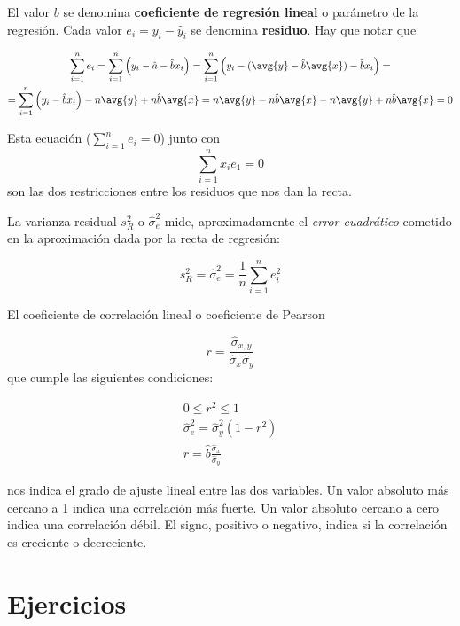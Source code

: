 \documentclass{apuntes}
\begin{document}
El valor $b$ se denomina \textbf{coeficiente de regresión lineal} o parámetro de la regresión. Cada valor $e_i= y_i - \hat{y}_i$ se denomina \textbf{residuo}. Hay que notar que

\begin{gather*}
 \sum_{i=1}^n e_i = \sum_{i=1}^n \left(y_i - \hat{a} -\hat{b}x_i \right)= \sum_{i=1}^n\left( y_i - (\avg{y} - \hat{b}\avg{x}) - \hat{b}x_i \right) = \\
 = \sum_{i=1}^n  \left(y_i - \hat{b}x_i\right) - n\avg{y}  + n\hat{b}\avg{x} = n\avg{y} - n \hat{b}\avg{x}- n\avg{y} + n\hat{b}\avg{x} = 0 \end{gather*}

Esta ecuación ($\sum_{i=1}^n e_i = 0$) junto con \[ \sum_{i=1}^n x_i e_1 = 0 \] son las dos restricciones entre los residuos que nos dan la recta.

\begin{defn}
La varianza residual $s_R^2$ o $\hat{\sigma}_e^2$ mide, aproximadamente el \textit{error cuadrático} cometido en la aproximación dada por la recta de regresión:

\[ s_R^2 = \hat{\sigma}_e^2 = \frac{1}{n}\sum_{i=1}^n e_i^2 \]
\end{defn}

\begin{defn}
El coeficiente de correlación lineal o coeficiente de Pearson

\[ r = \frac{\hat{\sigma}_{x,y}}{\hat{\sigma}_x \hat{\sigma}_y} \] que cumple las siguientes condiciones:

\begin{gather*}
0 ≤ r^2 ≤ 1 \\
\hat{\sigma}_e^2 = \hat{\sigma}_y^2(1-r^2) \\
r = \hat{b}\frac{\hat{\sigma}_x}{\hat{\sigma}_y} 
\end{gather*}

nos indica el grado de ajuste lineal entre las dos variables. Un valor absoluto más cercano a 1 indica una correlación más fuerte. Un valor absoluto cercano a cero indica una correlación débil. El signo, positivo o negativo, indica si la correlación es creciente o decreciente.
\end{defn}

\appendix
\section{Ejercicios}
\end{document}
